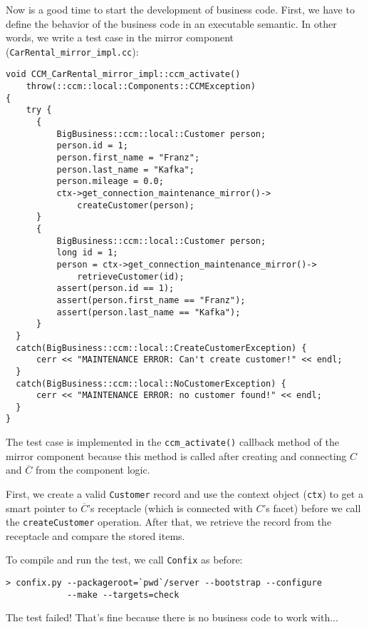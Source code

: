 Now is a good time to start the development of business code. First, we have to
define the behavior of the business code in an executable semantic. 
In other words, we write a test case in the mirror component 
({\tt CarRental\_mirror\_impl.cc}):
\begin{small}
\begin{verbatim}
void CCM_CarRental_mirror_impl::ccm_activate()
    throw(::ccm::local::Components::CCMException)
{
    try {
      {
          BigBusiness::ccm::local::Customer person;
          person.id = 1;
          person.first_name = "Franz";
          person.last_name = "Kafka";
          person.mileage = 0.0;
          ctx->get_connection_maintenance_mirror()->
              createCustomer(person);
      }
      {
          BigBusiness::ccm::local::Customer person;
          long id = 1;
          person = ctx->get_connection_maintenance_mirror()->
              retrieveCustomer(id);
          assert(person.id == 1);
          assert(person.first_name == "Franz");
          assert(person.last_name == "Kafka");
      }
  }
  catch(BigBusiness::ccm::local::CreateCustomerException) {
      cerr << "MAINTENANCE ERROR: Can't create customer!" << endl;
  }
  catch(BigBusiness::ccm::local::NoCustomerException) {
      cerr << "MAINTENANCE ERROR: no customer found!" << endl;
  }
}
\end{verbatim}
\end{small}
The test case is implemented in the {\tt ccm\_activate()} callback method of the
mirror component because this method is called after creating and connecting $C$
and $\overline{C}$ from the component logic. 

First, we create a valid {\tt Customer} record and  
use the context object ({\tt ctx}) to get a smart pointer
to $\overline{C}$'s receptacle (which is connected with $C$'s facet) 
before we call the {\tt createCustomer} operation. 
After that, we retrieve the record from the receptacle and compare the stored 
items.

To compile and run the test, we call {\tt Confix} as before:
\begin{small}
\begin{verbatim}
> confix.py --packageroot=`pwd`/server --bootstrap --configure 
            --make --targets=check 
\end{verbatim}
\end{small}
The test failed! 
That's fine because there is no business code to work with...






